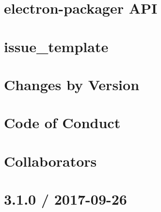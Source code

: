 \documentclass[twoside]{book}
\newcommand{\+}{\discretionary{\mbox{\scriptsize$\hookleftarrow$}}{}{}}
\begin{document}
\chapter{electron-\/packager A\+PI}
\label{md_dsmacc_vis_degree_node_modules_electron-packager_docs_api}

\chapter{issue\+\_\+template}
\label{md_dsmacc_vis_degree_node_modules_electron-packager_issue_template}

\chapter{Changes by Version}
\label{md_dsmacc_vis_degree_node_modules_electron-packager_NEWS}

\chapter{Code of Conduct}
\label{md_dsmacc_vis_degree_node_modules_electron-packager_node_modules_electron-download_CODE_OF_CONDUCT}

\chapter{Collaborators}
\label{md_dsmacc_vis_degree_node_modules_electron-packager_node_modules_electron-download_collaborators}

\chapter{3.1.0 / 2017-\/09-\/26}
\label{md_dsmacc_vis_degree_node_modules_electron-packager_node_modules_electron-download_node_modules_debug_CHANGELOG}

\end{document}

